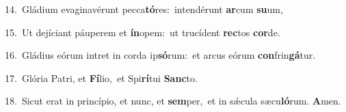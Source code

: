 {\numbfont\textcolor{\numbcolor}{14.}}~Gládium evaginavérunt pecca\-\textbf{tó}\-res:~\star intendérunt \textbf{ar}\-cum \textbf{su}\-um,\par
{\numbfont\textcolor{\numbcolor}{15.}}~Ut dejíciant páuperem et \textbf{ín}\-opem:~\star ut trucídent \textbf{rec}\-tos \textbf{cor}\-de.\par
{\numbfont\textcolor{\numbcolor}{16.}}~Gládius eórum intret in corda ip\-\textbf{só}\-rum:~\star et arcus eórum \textbf{con}\-frin\-\textbf{gá}\-tur.\par
{\numbfont\textcolor{\numbcolor}{17.}}~Glória Patri, et \textbf{Fí}\-lio,~\star et Spi\-\textbf{rí}\-tui \textbf{Sanc}\-to.\par
{\numbfont\textcolor{\numbcolor}{18.}}~Sicut erat in princípio, et nunc, et \textbf{sem}\-per,~\star et in sǽcula sæcu\-\textbf{ló}\-rum. \textbf{A}\-men.\par

